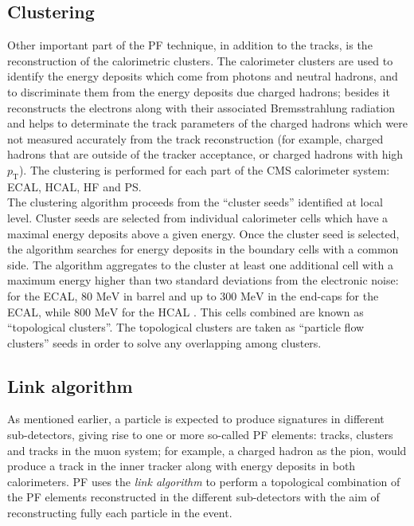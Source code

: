 \subsection{Clustering}
\label{subsec:Clustering}
Other important part of the PF technique, in addition to the tracks, is the reconstruction of the 
calorimetric clusters. The calorimeter clusters are used to identify the energy deposits which come from 
photons and neutral hadrons, and to discriminate them from the energy deposits due charged hadrons; 
besides it reconstructs the electrons along with their associated Bremsstrahlung radiation
and helps to determinate the track parameters of the charged hadrons which were not measured 
accurately from the track reconstruction (for example, charged hadrons that are outside of the tracker acceptance, or 
charged hadrons with high $p_{\textrm{T}}$). The clustering is performed for 
each part of the CMS calorimeter system: ECAL, HCAL, HF and PS.\\

The clustering algorithm proceeds from the ``cluster seeds'' identified at local level. Cluster seeds are selected 
from individual calorimeter cells which have a maximal energy deposits above a given energy. Once the cluster seed is selected,
the algorithm searches for energy deposits in the  boundary cells with a common side. The algorithm aggregates to the cluster 
at least one additional cell with a maximum energy higher than two standard deviations from the electronic noise: for the ECAL, 80 $\textrm{MeV}$ in 
barrel and up to 300 $\textrm{MeV}$ in the end-caps for the ECAL, while 800 $\textrm{MeV}$ for the HCAL \cite{CMS-PAS-PFT-09-001}. This
cells combined are known as ``topological clusters''. The topological clusters are taken as ``particle flow clusters'' seeds
in order to solve any overlapping among clusters.

\subsection{Link algorithm}
\label{subsec:Linkalgorithm}
As mentioned earlier, a particle is expected to produce signatures in different sub-detectors, giving rise to one or more 
so-called PF elements: tracks, clusters and tracks in the muon system; for example, 
a charged hadron as the pion, would produce a track in the inner tracker along with 
energy deposits in both calorimeters. PF uses the \textit{link algorithm} to perform a topological combination 
of the PF elements reconstructed in the different sub-detectors with the aim of reconstructing fully each particle in the event. \\

